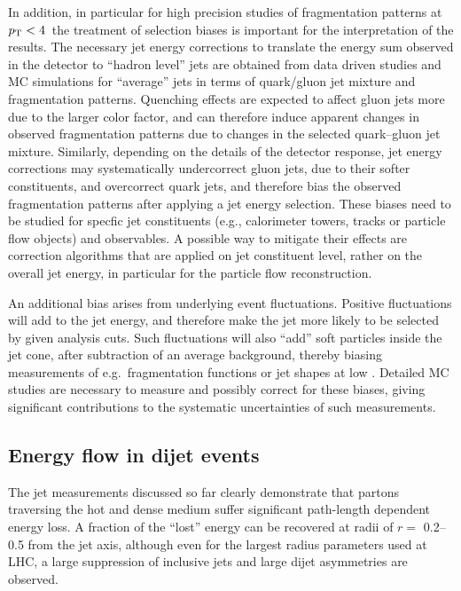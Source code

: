 In addition, in particular for high precision studies of fragmentation patterns at $\mbox{$p_{\mathrm{T}}$} < 4$\GeVc\,
the treatment of selection biases is important for the interpretation of the results. The necessary jet energy
corrections to translate the energy sum observed in the detector to ``hadron level'' jets are
obtained from data driven studies and MC simulations for ``average'' jets in terms of quark/gluon
jet mixture and fragmentation patterns. Quenching effects are expected to affect gluon jets more
due to the larger color factor, and can therefore induce apparent changes in observed fragmentation
patterns due to changes in the selected quark--gluon jet mixture. Similarly, depending on the
details of the detector response, jet energy corrections may systematically undercorrect gluon
jets, due to their softer constituents, and overcorrect quark jets, and therefore bias the
observed fragmentation patterns after applying a jet energy selection. These biases need to be
studied for specfic jet constituents (e.g., calorimeter towers, tracks or particle flow objects)
and observables. A possible way to mitigate their effects are correction algorithms that
are applied on jet constituent level, rather on the overall jet energy, in particular for
the particle flow reconstruction.

An additional bias arises from underlying event fluctuations. Positive fluctuations will add to the
jet energy, and therefore make the jet more likely to be selected by given analysis cuts. Such
fluctuations will also ``add'' soft particles inside the jet cone, after subtraction of an
average background, thereby biasing measurements of e.g.\ fragmentation functions or
jet shapes at low \pT. Detailed MC studies are necessary to measure and possibly correct
for these biases, giving significant contributions to the systematic uncertainties of
such measurements.


\subsection{Energy flow in dijet events}

The jet measurements discussed so far clearly demonstrate that partons traversing the hot and dense
medium suffer significant path-length dependent energy loss. A fraction of the ``lost'' energy
can be recovered at radii of $r=$ 0.2--0.5 from the jet axis, although even for the largest radius
parameters used at LHC, a large suppression of inclusive jets and large dijet asymmetries are
observed.

